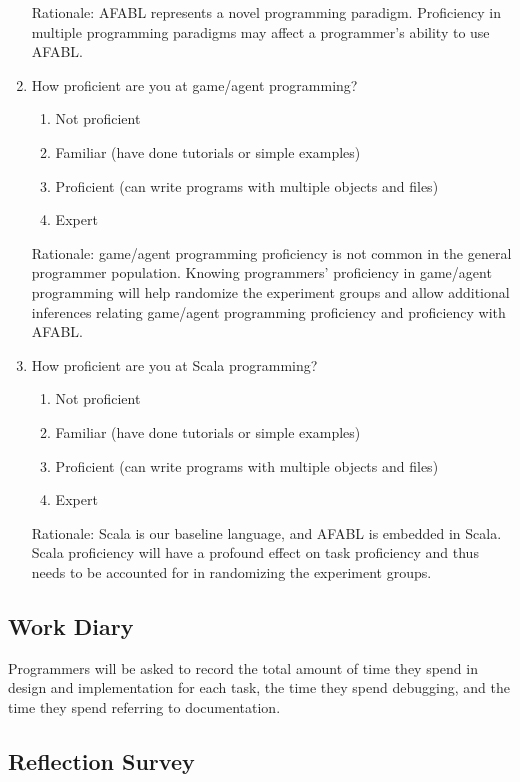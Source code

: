\begin{appendices}
\begin{enumerate}
Rationale: AFABL represents a novel programming paradigm.  Proficiency in multiple programming paradigms may affect a programmer’s ability to use AFABL.

\item How proficient are you at game/agent programming?  
\begin{enumerate}
\item Not proficient
\item Familiar (have done tutorials or simple examples)
\item Proficient (can write programs with multiple objects and files)
\item Expert
\end{enumerate}

Rationale: game/agent programming proficiency is not common in the general programmer population.  Knowing programmers’ proficiency in game/agent programming will help randomize the experiment groups and allow additional inferences relating game/agent programming proficiency and proficiency with AFABL.

\item How proficient are you at Scala programming?  
\begin{enumerate}
\item Not proficient
\item Familiar (have done tutorials or simple examples)
\item Proficient (can write programs with multiple objects and files)
\item Expert
\end{enumerate}

Rationale: Scala is our baseline language, and AFABL is embedded in Scala.  Scala proficiency will have a profound effect on task proficiency and thus needs to be accounted for in randomizing the experiment groups.

\end{enumerate}

\subsection{Work Diary}

Programmers will be asked to record the total amount of time they spend in design and implementation for each task, the time they spend debugging, and the time they spend referring to documentation.

\subsection{Reflection Survey}


\end{appendices}
